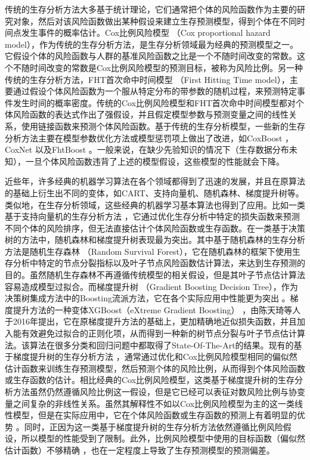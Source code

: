 传统的生存分析方法大多基于统计理论，它们通常把个体的风险函数作为主要的研究对象，然后对该风险函数做出某种假设来建立生存预测模型，得到个体在不同时间点发生事件的概率估计。Cox比例风险模型 （Cox proportional hazard model），作为传统的生存分析方法，是生存分析领域最为经典的预测模型之一。它假设个体的风险函数与人群的基准风险函数之比是一个不随时间改变的常数。这个不随时间改变的常数是Cox比例风险模型的预测目标，被称为风险比例。另一种传统的生存分析方法，FHT首次命中时间模型 （First Hitting Time model），主要通过假设个体风险函数为一个服从特定分布的带参数的随机过程，来预测特定事件发生时间的概率密度。传统的Cox比例风险模型和FHT首次命中时间模型都对个体风险函数的表达式作出了强假设，并且假定模型参数与预测变量之间的线性关系，使用链接函数来预测个体风险函数。基于传统的生存分析模型，一些新的生存分析方法主要在模型参数优化方法或模型惩罚项上做出了改进，如CoxBoost ，CoxNet 以及FhtBoost 。一般来说，在缺少先验知识的情况下（生存数据分布未知），一旦个体风险函数违背了上述的模型假设，这些模型的性能就会下降。

近些年，许多经典的机器学习算法在各个领域都得到了迅速的发展，并且在原算法的基础上衍生出不同的变体，如CART、支持向量机、随机森林、梯度提升树等。类似地，在生存分析领域，这些经典的机器学习基本算法也得到了应用。比如一类基于支持向量机的生存分析方法 ，它通过优化生存分析中特定的损失函数来预测不同个体的风险排序，但无法直接估计个体风险函数或生存函数。在一类基于决策树的方法中，随机森林和梯度提升树表现最为突出。其中基于随机森林的生存分析方法是随机生存森林 （Random Survival Forest），它在随机森林的框架下使用生存分析中特定的节点分裂指标以及叶子节点风险函数估计算法，来达到生存预测的目的。虽然随机生存森林不再遵循传统模型的相关假设，但是其叶子节点估计算法容易造成模型过拟合。而梯度提升树 （Gradient Boosting Decision Tree），作为决策树集成方法中的Boosting流派方法，它在各个实际应用中性能更为突出 。梯度提升方法的一种变体XGBoost（eXtreme Gradient Boosting） ，由陈天琦等人于2016年提出，它在原梯度提升方法的基础上，更加精确地近似损失函数，并且加入能有效避免过拟合的正则化项，从而得到一种新的树节点分裂与叶子节点估计算法。该算法在很多分类和回归问题中都取得了State-Of-The-Art的结果。现有的基于梯度提升树的生存分析方法 ，通常通过优化和Cox比例风险模型相同的偏似然估计函数来训练生存预测模型，然后预测个体的风险比例，从而得到个体风险函数或生存函数的估计。相比经典的Cox比例风险模型，这类基于梯度提升树的生存分析方法虽然仍然遵循风险比例这一假设，但是它已经可以表征对数风险比例与协变量之间复杂的非线性关系。虽然其解释性不如以Cox比例风险模型为主的这一类线性模型，但是在实际应用中，它在个体风险函数或生存函数的预测上有着明显的优势 。同时，正因为这一类基于梯度提升树的生存分析方法依然遵循比例风险假设，所以模型的性能受到了限制。此外，比例风险模型中使用的目标函数（偏似然估计函数）不够精确 ，也在一定程度上导致了生存预测模型的预测偏差。

